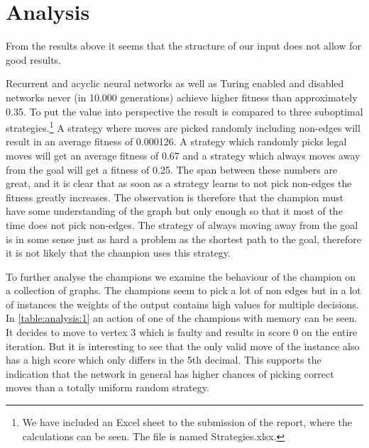 
\section{Analysis}
From the results above it seems that the structure of our input does not allow for good results.

\newpar Recurrent and acyclic neural networks as well as Turing enabled and disabled networks never (in 10.000 generations) achieve higher fitness than approximately 0.35. To put the value into perspective the result is compared to three suboptimal strategies.\footnote{We have included an Excel sheet to the submission of the report, where the calculations can be seen. The file is named Strategies.xlsx.} A strategy where moves are picked randomly including non-edges will result in an average fitness of 0.000126. A strategy which randomly picks legal moves will get an average fitness of 0.67 and a strategy which always moves away from the goal will get a fitness of 0.25. The span between these numbers are great, and it is clear that as soon as a strategy learns to not pick non-edges the fitness greatly increases. The observation is therefore that the champion must have some understanding of the graph but only enough so that it most of the time does not pick non-edges. The strategy of always moving away from the goal is in some sense just as hard a problem as the shortest path to the goal, therefore it is not likely that the champion uses this strategy. 

To further analyse the champions we examine the behaviour of the champion on a collection of graphs. The champions seem to pick a lot of non edges but in a lot of instances the weights of the output contains high values for multiple decisions. In \autoref{table:analysis:1} an action of one of the champions with memory can be seen. It decides to move to vertex 3 which is faulty and results in score 0 on the entire iteration. But it is interesting to see that the only valid move of the instance also has a high score which only differs in the 5th decimal. This supports the indication that the network in general has higher chances of picking correct moves than a totally uniform random strategy.

